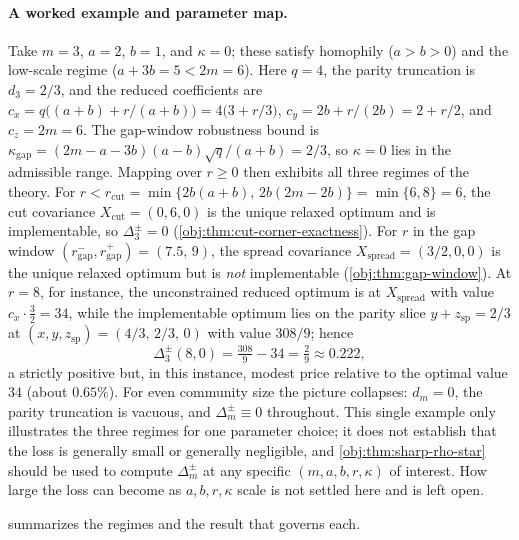 \documentclass[11pt]{article}
\begin{document}
\paragraph{A worked example and parameter map.} Take \(m=3\), \(a=2\), \(b=1\), and \(\kappa=0\); these satisfy homophily (\(a>b>0\)) and the low-scale regime (\(a+3b=5<2m=6\)). Here \(q=4\), the parity truncation is \(d_3=2/3\), and the reduced coefficients are \(c_x=q\bigl((a+b)+r/(a+b)\bigr)=4\bigl(3+r/3\bigr)\), \(c_y=2b+r/(2b)=2+r/2\), and \(c_z=2m=6\). The gap-window robustness bound is \(\kappa_{\mathrm{gap}}=(2m-a-3b)(a-b)\sqrt q/(a+b)=2/3\), so \(\kappa=0\) lies in the admissible range. Mapping over \(r\ge0\) then exhibits all three regimes of the theory. For \(r<r_{\mathrm{cut}}=\min\{2b(a+b),\,2b(2m-2b)\}=\min\{6,8\}=6\), the cut covariance \(X_{\mathrm{cut}}=(0,6,0)\) is the unique relaxed optimum and is implementable, so \(\Delta_3^{\pm}=0\) (\cref{obj:thm:cut-corner-exactness}). For \(r\) in the gap window \((r_{\mathrm{gap}}^-,r_{\mathrm{gap}}^+)=(7.5,\,9)\), the spread covariance \(X_{\mathrm{spread}}=(3/2,0,0)\) is the unique relaxed optimum but is \emph{not} implementable (\cref{obj:thm:gap-window}). At \(r=8\), for instance, the unconstrained reduced optimum is at \(X_{\mathrm{spread}}\) with value \(c_x\cdot\tfrac32=34\), while the implementable optimum lies on the parity slice \(y+z_{\mathrm{sp}}=2/3\) at \((x,y,z_{\mathrm{sp}})=(4/3,\,2/3,\,0)\) with value \(308/9\); hence
\[
\Delta_3^{\pm}(8,0)=\tfrac{308}{9}-34=\tfrac29\approx0.222,
\]
a strictly positive but, in this instance, modest price relative to the optimal value \(34\) (about \(0.65\%\)). For even community size the picture collapses: \(d_m=0\), the parity truncation is vacuous, and \(\Delta_m^{\pm}\equiv0\) throughout. This single example only illustrates the three regimes for one parameter choice; it does not establish that the loss is generally small or generally negligible, and \cref{obj:thm:sharp-rho-star} should be used to compute \(\Delta_m^{\pm}\) at any specific \((m,a,b,r,\kappa)\) of interest. How large the loss can become as \(a,b,r,\kappa\) scale is not settled here and is left open.

 summarizes the regimes and the result that governs each.
\end{document}
